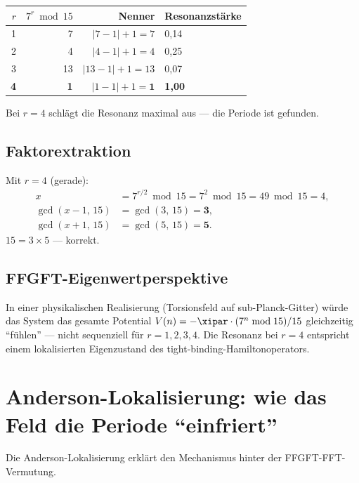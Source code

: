 \begin{center}
\begin{tabular}{rrrl}
\toprule
$r$ & $7^r \bmod 15$ & Nenner & Resonanzstärke \\
\midrule
1 & 7  & $|7-1|+1 = 7$  & 0{,}14 \\
2 & 4  & $|4-1|+1 = 4$  & 0{,}25 \\
3 & 13 & $|13-1|+1 = 13$& 0{,}07 \\
\textbf{4} & \textbf{1}  & $|1-1|+1 = \mathbf{1}$  & \textbf{1{,}00} \\
\bottomrule
\end{tabular}
\end{center}

Bei $r = 4$ schlägt die Resonanz maximal aus ---
die Periode ist gefunden.

\subsection{Faktorextraktion}

Mit $r = 4$ (gerade):
\begin{align}
  x &= 7^{r/2} \bmod 15 = 7^2 \bmod 15 = 49 \bmod 15 = 4, \\
  \gcd(x-1,\,15) &= \gcd(3,\,15) = \mathbf{3}, \\
  \gcd(x+1,\,15) &= \gcd(5,\,15) = \mathbf{5}.
\end{align}
$15 = 3 \times 5$ --- korrekt.

\subsection{FFGFT-Eigenwertperspektive}

In einer physikalischen Realisierung
(Torsionsfeld auf sub-Planck-Gitter)
würde das System das gesamte Potential
$V(n) = -\xipar \cdot (7^n \bmod 15)/15$
gleichzeitig ``fühlen'' ---
nicht sequenziell für $r = 1, 2, 3, 4$.
Die Resonanz bei $r = 4$ entspricht einem
lokalisierten Eigenzustand des
tight-binding-Hamiltonoperators.

\section{Anderson-Lokalisierung: wie das Feld
  die Periode ``einfriert''}
\label{sec:anderson-detail}

Die Anderson-Lokalisierung erklärt den Mechanismus
hinter der FFGFT-FFT-Vermutung.

